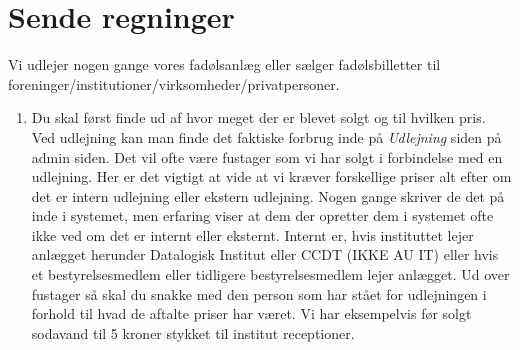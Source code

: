 \section{Sende regninger}
Vi udlejer nogen gange vores fadølsanlæg eller sælger fadølsbilletter til\\ foreninger/institutioner/virksomheder/privatpersoner.
\begin{enumerate}
    \item Du skal først finde ud af hvor meget der er blevet solgt og til hvilken pris. Ved udlejning kan man finde det faktiske forbrug inde på \textit{Udlejning} siden på admin siden. Det vil ofte være fustager som vi har solgt i forbindelse med en udlejning. Her er det vigtigt at vide at vi kræver forskellige priser alt efter om det er intern udlejning eller ekstern udlejning. Nogen gange skriver de det på inde i systemet, men erfaring viser at dem der opretter dem i systemet ofte ikke ved om det er internt eller eksternt. Internt er, hvis instituttet lejer anlægget herunder Datalogisk Institut eller CCDT (IKKE AU IT) eller hvis et bestyrelsesmedlem eller tidligere bestyrelsesmedlem lejer anlægget. Ud over fustager så skal du snakke med den person som har stået for udlejningen i forhold til hvad de aftalte priser har været. Vi har eksempelvis før solgt sodavand til 5 kroner stykket til institut receptioner. 

\end{enumerate}
